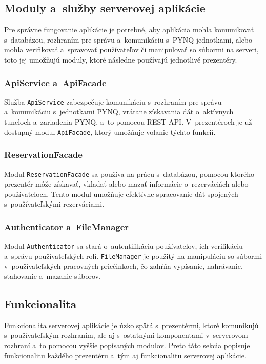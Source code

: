 \subsection{Moduly a~služby serverovej aplikácie}

Pre správne fungovanie aplikácie je potrebné, aby aplikácia mohla komunikovať s~databázou, rozhraním pre správu a~komunikáciu s~PYNQ jednotkami, alebo mohla verifikovať a~spravovať používateľov či manipulovať so súbormi na serveri, toto jej umožňujú moduly, ktoré následne používajú jednotlivé prezentéry. 

\subsubsection*{ApiService a~ApiFacade}

Služba \verb|ApiService| zabezpečuje komunikáciu s~rozhraním pre správu a~komunikáciu s~jednotkami PYNQ, vrátane získavania dát o~aktívnych tuneloch a~zariadenia PYNQ, a~to pomocou REST API. V~prezentéroch je už dostupný modul \verb|ApiFacade|, ktorý umožňuje volanie týchto funkcií.

\subsubsection*{ReservationFacade}

Modul \verb|ReservationFacade| sa používa na prácu s~databázou, pomocou ktorého prezentér môže získavať, vkladať alebo mazať informácie o~rezerváciách alebo používateľoch. Tento modul umožňuje efektívne spracovanie dát spojených s~používateľskými rezerváciami.

\subsubsection*{Authenticator a~FileManager}

Modul \verb|Authenticator| sa stará o~autentifikáciu používateľov, ich verifikáciu a~správu používateľských rolí. \verb|FileManager| je použitý na manipuláciu so súbormi v~používateľských pracovných priečinkoch, čo zahŕňa vypísanie, nahrávanie, sťahovanie a~mazanie súborov.

\subsection{Funkcionalita}

Funkcionalita serverovej aplikácie je úzko spätá s~prezentérmi, ktoré komunikujú s~používateľským rozhraním, ale aj s~ostatnými komponentami v~serverovom rozhraní a~to pomocou vyššie popísaných modulov. Preto táto sekcia popisuje funkcionalitu každého prezentéru a~tým aj funkcionalitu serverovej aplikácie.

